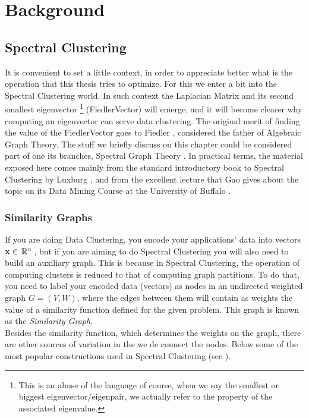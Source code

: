 \chapter{Background}
\label{cha:backg}

\section{Spectral Clustering}

It is convenient to set a little context, in order to appreciate
better what is the operation that this thesis tries to optimize. For
this we enter a bit into the Spectral Clustering world. In such
context the \gls{Laplacian} Matrix and its second smallest eigenvector
\footnote{This is an abuse of the language of course, when
we say the smallest or biggest eigenvector/eigenpair, we actually refer to
the property of the associated eigenvalue.}
(\gls{FiedlerVector}) will emerge, and it will become clearer why computing
an eigenvector can serve data clustering. The original merit of
finding the value of the \gls{FiedlerVector} goes to Fiedler
\cite{fiedler73}, considered the father of Algebraic Graph Theory. 
The stuff we briefly discuss on this chapter could be considered part
of one its branches, Spectral Graph Theory \cite{brouwer12}. In
practical terms, the material exposed here comes mainly from the
standard introductory book to Spectral Clustering by Luxburg \cite{luxburg07},
and from the excellent lecture that Gao gives about the topic on
its Data Mining Course at the University of Buffalo \cite{gao13}.

\subsection{Similarity Graphs}

If you are doing Data Clustering, you encode your applications' data
into vectors $\mathbf{x} \in \,\mathbb{R}^{n}\,$, but if you are aiming to do Spectral
Clustering you will also need to build an auxiliary graph. This is
because in Spectral Clustering, the operation of computing clusters is
reduced to that of computing graph partitions. To do that, you need to
label your encoded data (vectors) as nodes in an undirected weighted graph $G =
(V,W)$, where the edges between them will contain as weights the value 
of a similarity function defined for the given problem. This graph is
known as the \emph{Similarity Graph}. \\

Besides the similarity function, which determines the weights on the
graph, there are other sources of variation in the we de connect the
nodes. Below some of the most popular constructions used in Spectral
Clustering (see \cite{luxburg07}). \\

